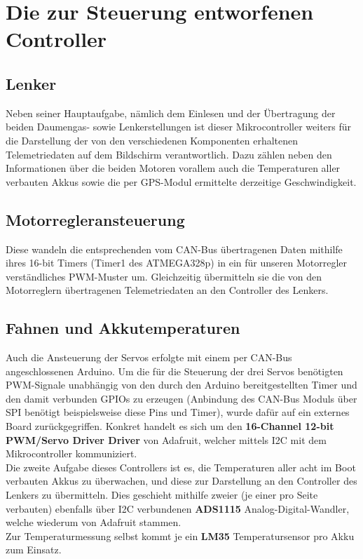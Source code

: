 \section{Die zur Steuerung entworfenen Controller}
\subsection{Lenker}
Neben seiner Hauptaufgabe, nämlich dem Einlesen und der Übertragung der beiden Daumengas- sowie Lenkerstellungen ist dieser Mikrocontroller weiters für die Darstellung der von den verschiedenen Komponenten erhaltenen Telemetriedaten auf dem Bildschirm verantwortlich.
Dazu zählen neben den Informationen über die beiden Motoren vorallem auch die Temperaturen aller verbauten Akkus sowie die per GPS-Modul ermittelte derzeitige Geschwindigkeit.

\subsection{Motorregleransteuerung}
Diese wandeln die entsprechenden vom CAN-Bus übertragenen Daten mithilfe ihres 16-bit Timers (Timer1 des ATMEGA328p) in ein für unseren Motorregler verständliches PWM-Muster um.
Gleichzeitig übermitteln sie die von den Motorreglern übertragenen Telemetriedaten an den Controller des Lenkers.

\newpage
\subsection{Fahnen und Akkutemperaturen}
Auch die Ansteuerung der Servos erfolgte mit einem per CAN-Bus angeschlossenen Arduino. Um die für die Steuerung der drei Servos benötigten PWM-Signale unabhängig von den durch den Arduino bereitgestellten Timer und den damit verbunden GPIOs zu erzeugen 
(Anbindung des CAN-Bus Moduls über SPI benötigt beispielsweise diese Pins und Timer), wurde dafür auf ein externes Board zurückgegriffen.
Konkret handelt es sich um den \textbf{16-Channel 12-bit PWM/Servo Driver Driver} von Adafruit, welcher mittels I2C mit dem Mikrocontroller kommuniziert.\\

Die zweite Aufgabe dieses Controllers ist es, die Temperaturen aller acht im Boot verbauten Akkus zu überwachen, und diese zur Darstellung an den Controller des Lenkers zu übermitteln.
Dies geschieht mithilfe zweier (je einer pro Seite verbauten) ebenfalls über I2C verbundenen \textbf{ADS1115} Analog-Digital-Wandler, welche wiederum von Adafruit stammen.\\
Zur Temperaturmessung selbst kommt je ein \textbf{LM35} Temperatursensor pro Akku zum Einsatz.\\

